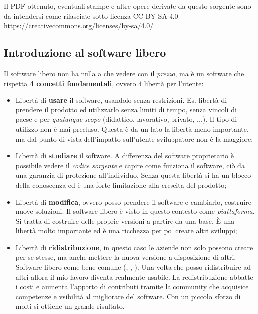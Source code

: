 \noindent Il PDF ottenuto, eventuali stampe e altre opere derivate da questo sorgente sono da intendersi come rilasciate sotto licenza CC-BY-SA 4.0 \\
\url{https://creativecommons.org/licenses/by-sa/4.0/}


\subsection{Introduzione al software libero}

Il software libero non ha nulla a che vedere con il \textit{prezzo}, ma è un software che rispetta \textbf{4 concetti fondamentali}, ovvero 4 libertà per l'utente:

\begin{itemize}

\item Libertà di \textbf{usare} il software, usandolo senza restrizioni. Es. libertà di prendere il prodotto ed utilizzarlo senza limiti di tempo, senza vincoli di paese e per \textit{qualunque scopo} (didattico, lavorativo, privato, ...). Il tipo di utilizzo non è mai precluso. Questa è da un lato la libertà meno importante, ma dal punto di vista dell'impatto sull'utente sviluppatore non è la maggiore;
\item Libertà di \textbf{studiare} il software. A differenza del software proprietario è possibile vedere il \textit{codice sorgente} e capire come funziona il software, ciò da una garanzia di protezione all'individuo. Senza questa libertà si ha un blocco della conoscenza ed è una forte limitazione alla crescita del prodotto;
\item Libertà di \textbf{modifica}, ovvero posso prendere il software e cambiarlo, costruire nuove soluzioni. Il software libero è visto in questo contesto come \textit{piattaforma}. Si tratta di costruire delle proprie versioni a partire da una base. È una libertà molto importante ed è una ricchezza per poi creare altri sviluppi;
\item Libertà di \textbf{ridistribuzione}, in questo caso le aziende non solo possono creare per se stesse, ma anche mettere la nuova versione a disposizione di altri. Software libero come bene comune (, , ). Una volta che posso ridistribuire ad altri allora il mio lavoro diventa realmente usabile. La redistribuzione abbatte i costi e aumenta l'apporto di contributi tramite la community che acquisice competenze e vsibilità al migliorare del software. Con un piccolo sforzo di molti si ottiene un grande risultato.

\end{itemize}

